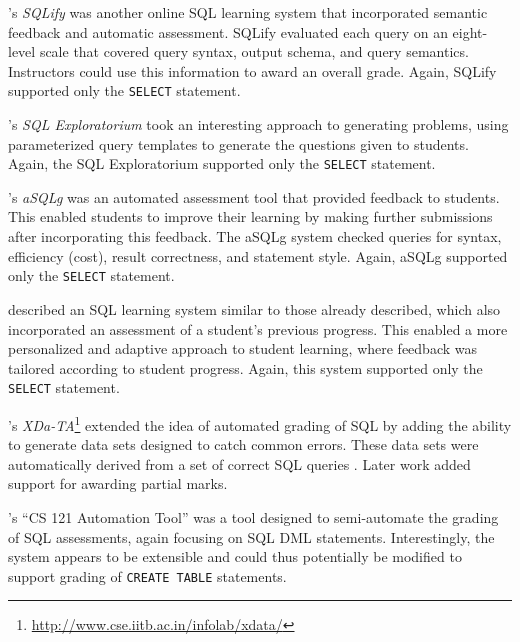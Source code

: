 \documentclass[sigconf, authordraft, capitalise]{acmart}
\begin{document}
\citeauthor{Dekeyser.S-2007a-Computer}'s \emph{SQLify} \cite{Dekeyser.S-2007a-Computer} was another online SQL learning system that incorporated semantic feedback and automatic assessment. SQLify evaluated each query on an eight-level scale that covered query syntax, output schema, and query semantics. Instructors could use this information to award an overall grade. Again, SQLify supported only the \texttt{SELECT} statement.

\citeauthor{Brusilovsky.P-2010a-Learning}'s \emph{SQL Exploratorium} \cite{Brusilovsky.P-2010a-Learning} took an interesting approach to generating problems, using parameterized query templates to generate the questions given to students. Again, the SQL Exploratorium supported only the \texttt{SELECT} statement.

\citeauthor{Kleiner.C-2013a-Automated}'s \emph{aSQLg} \cite{Kleiner.C-2013a-Automated} was an automated assessment tool that provided feedback to students. This enabled students to improve their learning by making further submissions after incorporating this feedback. The aSQLg system checked queries for syntax, efficiency (cost), result correctness, and statement style. Again, aSQLg supported only the \texttt{SELECT} statement.

\citeauthor{Kenny.C-2005a-Automated} \cite{Kenny.C-2005a-Automated} described an SQL learning system similar to those already described, which also incorporated an assessment of a student's previous progress. This enabled a more personalized and adaptive approach to student learning, where feedback was tailored according to student progress. Again, this system supported only the \texttt{SELECT} statement.

\citeauthor{Bhangdiya.A-2015a-XDa-TA}'s \emph{XDa-TA}\footnote{\url{http://www.cse.iitb.ac.in/infolab/xdata/}} extended the idea of automated grading of SQL by adding the ability to generate data sets designed to catch common errors. These data sets were automatically derived from a set of correct SQL queries \cite{Bhangdiya.A-2015a-XDa-TA,Chandra.B-2015a-Data}. Later work \cite{Chandra.B-2016a-Partial} added support for awarding partial marks.

\citeauthor{Gong.A-2015a-CS-121-Automation}'s ``CS 121 Automation Tool'' \cite{Gong.A-2015a-CS-121-Automation} was a tool designed to semi-automate the grading of SQL assessments, again focusing on SQL DML statements. Interestingly, the system appears to be extensible and could thus potentially be modified to support grading of \texttt{CREATE TABLE} statements.
\end{document}
